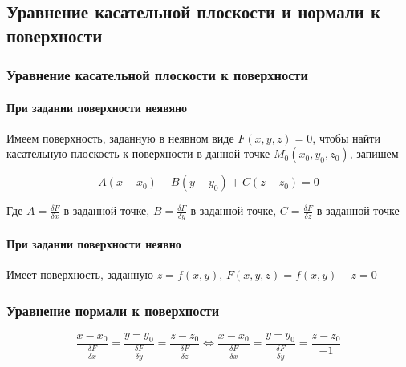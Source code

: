 \documentclass{article}
\begin{document}
\subsection{Уравнение касательной плоскости и нормали к поверхности}

\subsubsection{Уравнение касательной плоскости к поверхности}

\paragraph{При задании поверхности неявяно} Имеем поверхность, заданную в неявном виде $F(x, y, z) = 0$, чтобы найти касательную плоскость к поверхности в данной точке $M_0(x_0, y_0, z_0)$, запишем

$$A(x - x_0) + B(y - y_0) + C(z - z_0) = 0$$

Где $A = \frac{\delta F}{\delta x}$ в заданной точке, $B = \frac{\delta F}{\delta y}$ в заданной точке, $C = \frac{\delta F}{\delta z}$ в заданной точке

\paragraph{При задании поверхности неявно} Имеет поверхность, заданную $z = f(x, y)$, $F(x, y, z) = f(x, y) - z = 0$

\subsubsection{Уравнение нормали к поверхности}

$$
\frac{x - x_0}{\frac{\delta F}{\delta x}} = \frac{y - y_0}{\frac{\delta F}{\delta y}} = \frac{z - z_0}{\frac{\delta F}{\delta z}} \Longleftrightarrow
\frac{x - x_0}{\frac{\delta F}{\delta x}} = \frac{y - y_0}{\frac{\delta F}{\delta y}} = \frac{z - z_0}{-1}
$$
\end{document}
